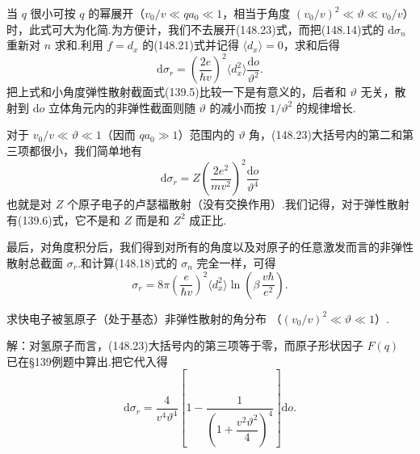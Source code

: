 当 $q$ 很小可按 $q$ 的幂展开（$v_0/v\ll qa_0\ll1$，相当于角度 $(v_0/v)^2\ll\vartheta\ll v_0/v$）时，此式可大为化简.为方便计，我们不去展开(148.23)式，而把(148.14)式的 $\mathrm{d}\sigma_n$ 重新对 $n$ 求和.利用 $f=d_x$ 的(148.21)式并记得 $\langle d_x\rangle=0$，求和后得
\begin{equation}
  \mathrm{d}\sigma_r=\left(\frac{2e}{\hbar v}\right)^2\langle d_x^2\rangle\frac{\mathrm{d}o}{\vartheta^2}.
\end{equation}
把上式和小角度弹性散射截面式(139.5)比较一下是有意义的，后者和 $\vartheta$ 无关，散射到 $\mathrm{d}o$ 立体角元内的非弹性截面则随 $\vartheta$ 的减小而按 $1/\vartheta^2$ 的规律增长.

对于 $v_0/v\ll\vartheta\ll1$（因而 $qa_0\gg1$）范围内的 $\vartheta$ 角，(148.23)大括号内的第二和第三项都很小，我们简单地有
\begin{equation}
  \mathrm{d}\sigma_r=Z\left(\frac{2e^2}{mv^2}\right)^2\frac{\mathrm{d}o}{\vartheta^4}
\end{equation}
也就是对 $Z$ 个原子电子的卢瑟福散射（没有交换作用）.我们记得，对于弹性散射有(139.6)式，它不是和 $Z$ 而是和 $Z^2$ 成正比.

最后，对角度积分后，我们得到对所有的角度以及对原子的任意激发而言的非弹性散射总截面 $\sigma_r$.和计算(148.18)式的 $\sigma_n$ 完全一样，可得
\begin{equation}
  \sigma_r=8\pi\left(\frac{e}{\hbar v}\right)^2\langle d_x^2\rangle
  \ln\left(\beta\,\frac{v\hbar}{e^2}\right).
\end{equation}

\par\medskip{}\par\smallskip\noindent

\quad 求快电子被氢原子（处于基态）非弹性散射的角分布
（$\left(v_0/v\right)^2\ll\vartheta\ll1$）.

解：对氢原子而言，(148.23)大括号内的第三项等于零，而原子形状因子 $F(q)$ 已在§139例题中算出.把它代入得
\begin{equation*}
  \mathrm{d}\sigma_r=\frac{4}{v^4\vartheta^4}
  \left[1-\frac{1}{\left(1+\dfrac{v^2\vartheta^2}{4}\right)^4}\right]\mathrm{d}o.
\end{equation*}

